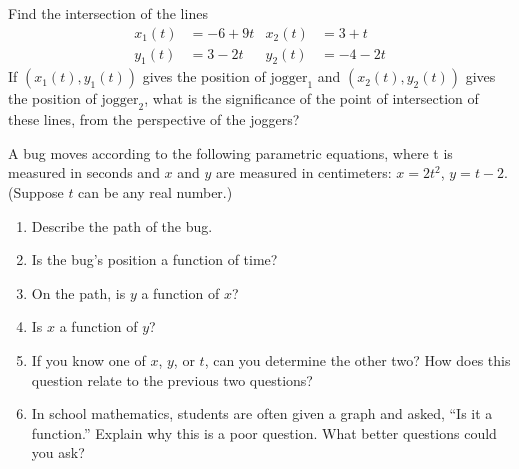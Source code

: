 %

\begin{prob}
Find the intersection of the lines
\begin{align*}
x_1(t) &= -6 + 9t & x_2(t) &= 3+t \\
y_1(t) &= 3-2t &  y_2(t) &= -4-2t 
\end{align*}
If $(x_1(t),y_1(t))$ gives the position of $\mathrm{jogger}_1$ and
$(x_2(t),y_2(t))$ gives the position of $\mathrm{jogger}_2$, what is
the significance of the point of intersection of these lines, from the
perspective of the joggers?
\end{prob}

\begin{prob}
A bug moves according to the following parametric equations, where t is measured in seconds and $x$ and $y$ are measured in centimeters:  $x = 2t^2$, $y = t-2$.  (Suppose $t$ can be any real number.)   
\begin{enumerate}
\item Describe the path of the bug.  
\item Is the bug's position a function of time?  
\item On the path, is $y$ a function of $x$?  
\item Is $x$ a function of $y$?  
\item If you know one of $x$, $y$, or $t$, can you determine the other two?  How does this question relate to the previous two questions?  
\item In school mathematics, students are often given a graph and asked, ``Is it a function.''  Explain why this is a poor question.  What better questions could you ask?  
\end{enumerate}
\end{prob}

